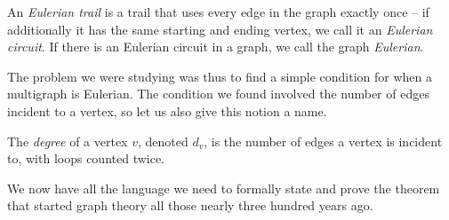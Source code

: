 \documentclass[nobib]{tufte-handout}
\begin{document}
\begin{definition}
  An \emph{Eulerian trail} is a trail that uses every edge in the graph exactly once -- if additionally it has the same starting and ending vertex, we call it an \emph{Eulerian circuit}. If there is an Eulerian circuit in a graph, we call the graph \emph{Eulerian}.
\end{definition}

The problem we were studying was thus to find a simple condition for when a multigraph is Eulerian. The condition we found involved the number of edges incident to a vertex, so let us also give this notion a name.

\begin{definition}
  The \emph{degree} of a vertex $v$, denoted $d_v$, is the number of edges a vertex is incident to, with loops counted twice.
\end{definition}

We now have all the language we need to formally state and prove the theorem that started graph theory all those nearly three hundred years ago.
\end{document}
